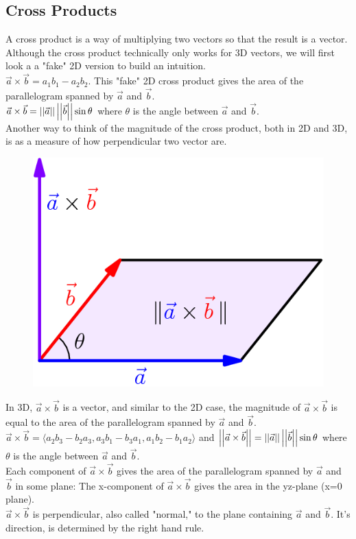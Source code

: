 \subsection{Cross Products}
\noindent
A cross product is a way of multiplying two vectors so that the result is a vector. Although the cross product technically only works for 3D vectors, we will first look a a "fake" 2D version to build an intuition.\\
$\vec{a}\times\vec{b} = a_1b_1-a_2b_2$. This "fake" 2D cross product gives the area of the parallelogram spanned by $\vec{a}$ and $\vec{b}$.\\
$\vec{a}\times\vec{b} = \left|\left|\vec{a}\right|\right|\left|\left|\vec{b}\right|\right|\sin{\theta}$ where $\theta$ is the angle between $\vec{a}$ and $\vec{b}$.\\
Another way to think of the magnitude of the cross product, both in 2D and 3D, is as a measure of how perpendicular two vector are.

\begin{figure}[h]
	\centering
	\includegraphics[scale=0.33]{Images/backgroundReview/CrossProduct}
\end{figure}


\noindent
In 3D, $\vec{a}\times\vec{b}$ is a vector, and similar to the 2D case, the magnitude of $\vec{a}\times\vec{b}$ is equal to the area of the parallelogram spanned by $\vec{a}$ and $\vec{b}$.\\
$\vec{a}\times\vec{b} = \langle a_2b_3-b_2a_3,a_3b_1-b_3a_1,a_1b_2-b_1a_2 \rangle$ and $\left|\left|\vec{a}\times\vec{b}\right|\right|=\left|\left|\vec{a}\right|\right|\left|\left|\vec{b}\right|\right|\sin{\theta}$ where $\theta$ is the angle between $\vec{a}$ and $\vec{b}$.\\
Each component of $\vec{a}\times\vec{b}$ gives the area of the parallelogram spanned by $\vec{a}$ and $\vec{b}$ in some plane: The x-component of $\vec{a}\times\vec{b}$ gives the area in the yz-plane (x=0 plane).\\
$\vec{a}\times\vec{b}$ is perpendicular, also called "normal," to the plane containing $\vec{a}$ and $\vec{b}$. It's direction, is determined by the right hand rule.\\

